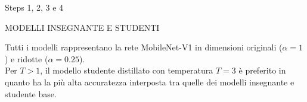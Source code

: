 \begin{subsection}{Steps 1, 2, 3 e 4}
  \begin{frame}{MODELLI INSEGNANTE E STUDENTI}
    \renewcommand{\thefootnote}{\fnsymbol{footnote}}
    \begin{minipage}{\linewidth}
      \centering
      \begin{minipage}{0.45\linewidth}
        Tutti i modelli rappresentano la rete MobileNet-V1 in dimensioni originali ($\alpha=1$) e ridotte ($\alpha=0.25$).\\ 
        Per $T>1$, il modello studente distillato con temperatura $T=3$ è preferito in quanto ha la più alta accuratezza interposta tra quelle dei modelli insegnante e studente base.
      \end{minipage}
      \hspace{0.3cm}
      \begin{minipage}{0.50\linewidth}
        \begin{center}
\end{center}
\end{minipage}
\end{minipage}
\end{frame}
\end{subsection}
